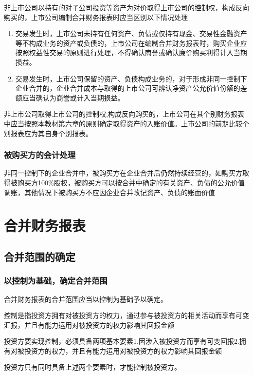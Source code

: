 \documentclass[UTF8,12pt]{ctexart}
\numberwithin{equation}{section} %
\numberwithin{figure}{section}
\numberwithin{table}{section}
\begin{document}
	非上市公司以持有的对子公司投资等资产为对价取得上市公司的控制权，构成反向购买的，上市公司编制合并财务报表时应当区别以下情况处理
	\begin{enumerate}
		\item 交易发生时，上市公司未持有任何资产、负债或仅持有现金、交易性金融资产等不构成业务的资产或负债的，上市公司在编制合并财务报表时，购买企业应按照权益性交易的原则进行处理，不得确认商誉或确认廉价购买利得计入当期损益。
		
		\item 交易发生时，上市公司保留的资产、负债构成业务的，对于形成非同一控制下企业合并的，企业合并成本与取得的上市公司可辨认净资产公允价值份额的差额应当确认为商誉或计入当期损益。
		
	\end{enumerate}
	非上市公司取得上市公司的控制权,构成反向购买的，上市公司在其个别财务报表中应当按照本教材第六章的原则确定取得资产的入账价值。上市公司的前期比较个别报表应为其自身个别报表。
	
	\subsubsection{被购买方的会计处理}
	非同一控制下的企业合并中，被购买方在企业合并后仍然持续经营的，如购买方取得被购买方100\%股权，被购买方可以按合并中确定的有关资产、负债的公允价值调账，其他情况下被购买方不应因企业合并改记资产、负债的账面价值
	
	\newpage
	
	\section{合并财务报表}
	\subsection{合并范围的确定}
	\subsubsection{以控制为基础，确定合并范围}
	合并财务报表的合并范围应当以控制为基础予以确定。
	
	控制是指投资方拥有对被投资方的权力，通过参与被投资方的相关活动而享有可变汇报，并且有能力运用对被投资方的权力影响其回报金额
	
	投资方要实现控制，必须具备两项基本要素1.因涉入被投资方而享有可变回报2.拥有对被投资方的权力，并且有能力运用对被投资方的权力影响其回报金额
	
	投资方只有同时具备上述两个要素时，才能控制被投资方。
	
\end{document}
